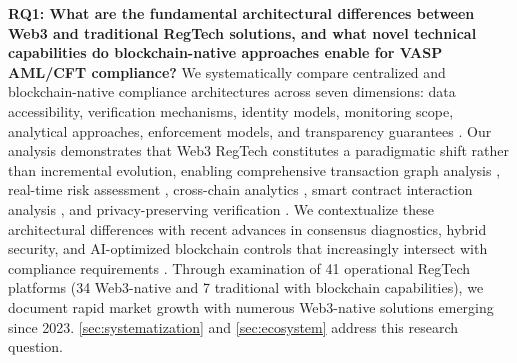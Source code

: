 \noindent\textbf{RQ1: What are the fundamental architectural differences between Web3 and traditional RegTech solutions, and what novel technical capabilities do blockchain-native approaches enable for VASP AML/CFT compliance?}
We systematically compare centralized and blockchain-native compliance architectures across seven dimensions: data accessibility, verification mechanisms, identity models, monitoring scope, analytical approaches, enforcement models, and transparency guarantees \cite{arner2016fintechregtechreconceptualization,zetsche2017fintechtechfinregulatory}. Our analysis demonstrates that Web3 RegTech constitutes a paradigmatic shift rather than incremental evolution, enabling comprehensive transaction graph analysis \cite{meiklejohn2013fistfulbitcoinscharacterizing,reid2013analysisanonymitybitcoin}, real-time risk assessment \cite{moser2014riskscoringbitcoin,weber2019antimoneylaunderingbitcoin}, cross-chain analytics \cite{yousaf2019tracingtransactionscryptocurrency,zamyatin2021sokcommunicationdistributed}, smart contract interaction analysis \cite{chen2020understandingethereumgraph,qin2021attackingdefiecosystem}, and privacy-preserving verification \cite{ben-sasson2017scalablezeroknowledge,zhang2024blockchainzeroknowledge}. We contextualize these architectural differences with recent advances in consensus diagnostics, hybrid security, and AI-optimized blockchain controls that increasingly intersect with compliance requirements \cite{ahn2024blockchainconsensusmechanisms,cai2025blockchainconsensusalgorithm,wei2024enhancedconsensusalgorithm,venkatesan2024blockchainsecurityenhancement,yuan2025aidrivenoptimizationblockchain}. Through examination of 41 operational RegTech platforms (34 Web3-native and 7 traditional with blockchain capabilities), we document rapid market growth with numerous Web3-native solutions emerging since 2023. \autoref{sec:systematization} and \autoref{sec:ecosystem} address this research question.

